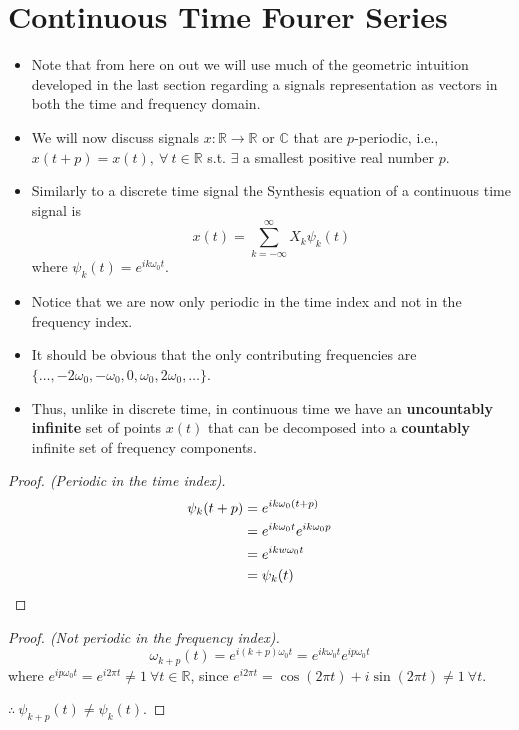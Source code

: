 \section{Continuous Time Fourer Series}
\begin{itemize}
	\item Note that from here on out we will use much of the geometric
	      intuition developed in the last section regarding
	      a signals representation as vectors in both the time and frequency domain.
	\item We will now discuss signals
	      $x: \mathbb{R} \longrightarrow \mathbb{R} \text{ or } \mathbb{C}$ that
	      are $p$-periodic, i.e., $x(t+p) = x(t),\ \forall\ t \in \mathbb{R}$ s.t.
	      $\exists$ a smallest positive real number $p$.
	\item Similarly to a discrete time signal the Synthesis equation of a
	      continuous time signal is
	      \[
		      x(t) = \sum_{k = -\infty}^{\infty} X_{k}\psi_{k}(t)
	      \]
	      where $\psi_{k}(t) = e^{ik\omega_0 t}$.
	\item Notice that we are now only periodic in the time index and
	      not in the frequency index.
	\item It should be obvious that the only contributing frequencies are
	      $\{\ldots, -2\omega_0,-\omega_0,0,\omega_0,2\omega_0,\ldots\}$.
	\item Thus, unlike in discrete time, in continuous time we have an
	      \textbf{uncountably infinite} set of points $x(t)$ that can be decomposed
	      into a \textbf{countably} infinite set of frequency components.
\end{itemize}
\begin{proof}[Proof. (Periodic in the time index)]
	\begin{align*}
		\psi_{k}(t+p) & = e^{ik\omega_0 (t+p)}             \\
		              & = e^{ik\omega_0 t}e^{ik\omega_0 p} \\
		              & = e^{ikw\omega_0 t}                \\
		              & = \psi_{k}(t) \qedhere
	\end{align*}
\end{proof}
\begin{proof}[Proof. (Not periodic in the frequency index)]
	\[
		\omega_{k+p}(t) = e^{i(k+p)\omega_0 t} = e^{ik\omega_0 t} e^{ip\omega_0 t}
	\]
	where $e^{ip\omega_0 t} = e^{i2\pi t} \neq 1\ \forall t \in \mathbb{R}$, since
	$e^{i 2\pi t} = \cos(2\pi t) + i\sin(2\pi t) \neq 1\ \forall t$.


	$\therefore\ \psi_{k+p}(t) \neq \psi_{k}(t)$.
\end{proof}
